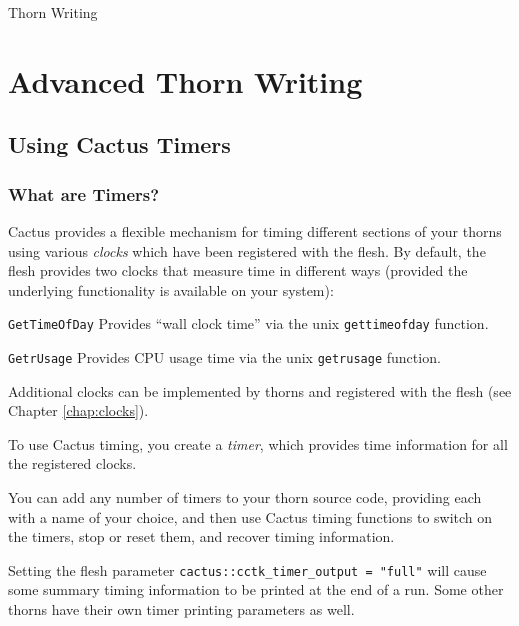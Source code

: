 \begin{cactuspart}{Thorn Writing}

\section{Advanced Thorn Writing}


\subsection{Using Cactus Timers}
\label{sec:timers}

\subsubsection{What are Timers?}

Cactus provides a flexible mechanism for timing different sections of your
thorns using various \textit{clocks} which have been registered with the flesh. 
By default, the flesh provides two clocks that measure time in different
ways (provided the underlying functionality is available on your system):

\begin{Lentry}

\item[\texttt{GetTimeOfDay}]
        Provides ``wall clock time'' via the unix \texttt{gettimeofday} function.
\item[\texttt{GetrUsage}]
        Provides CPU usage time via the unix \texttt{getrusage} function.
\end{Lentry}

Additional clocks can be implemented by thorns and registered with the
flesh (see Chapter \ref{chap:clocks}).

To use Cactus timing, you create a \textit{timer}, which provides time
information for all the registered clocks.

You can add any number of timers to your thorn source code, providing
each with a name of your choice, and then use Cactus timing functions to
switch on the timers, stop or reset them, and recover timing information.

Setting the flesh parameter \texttt{cactus::cctk\_timer\_output = "full"}
will cause some summary timing information to be printed at the end of a run. 
Some other thorns have their own timer printing parameters as well.


\end{cactuspart}
